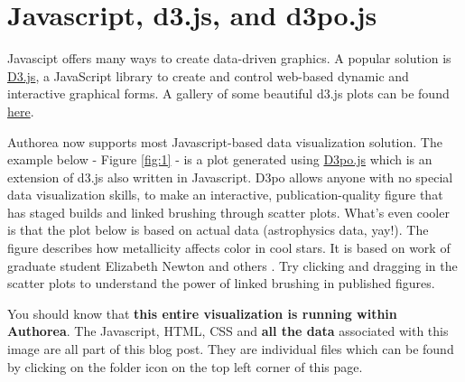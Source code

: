 \section{Javascript, d3.js, and d3po.js}

Javascipt offers many ways to create data-driven graphics. A popular solution is \href{http://d3js.org/}{D3.js}, a JavaScript library to create and control web-based dynamic and interactive graphical forms. A gallery of some beautiful d3.js plots can be found \href{https://github.com/mbostock/d3/wiki/Gallery}{here}.

Authorea now supports most Javascript-based data visualization solution. The example below - Figure \ref{fig:1} - is a plot generated using \href{http://d3pojs.org/}{D3po.js} which is an extension of d3.js also written in Javascript. D3po allows anyone with no special data visualization skills, to make an interactive, publication-quality figure that has staged builds and linked brushing through scatter plots. What's even cooler is that the plot below is based on actual data (astrophysics data, yay!). The figure describes how metallicity affects color in cool stars. It is based on work of graduate student Elizabeth Newton and others \cite{2014AJ....147...20N}. Try clicking and dragging in the scatter plots to understand the power of linked brushing in published figures.

You should know that \textbf{this entire visualization is running within Authorea}. The Javascript, HTML, CSS and \textbf{all the data} associated with this image are all part of this blog post. They are individual files which can be found by clicking on the folder icon on the top left corner of this page.

 